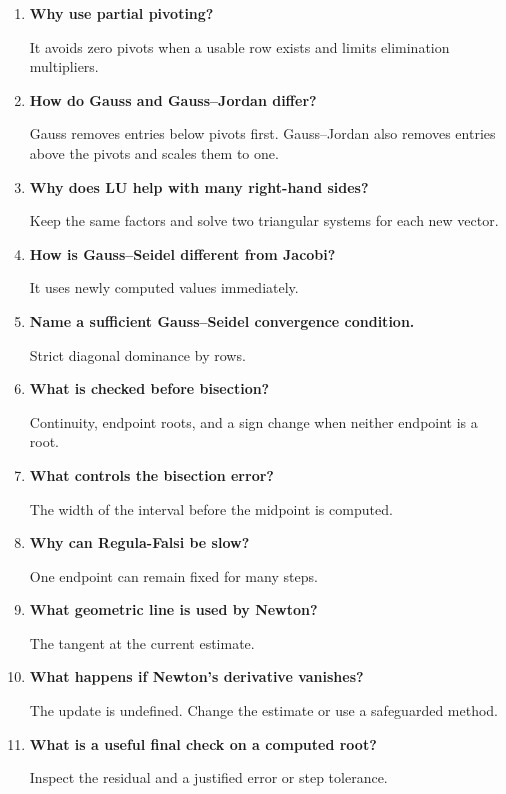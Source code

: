 \documentclass[12pt,a4paper]{article}
\newcommand{\Q}[1]{\textbf{#1}\par\noindent\ignorespaces}
\begin{document}
\begin{tcolorbox}[exambox, title={Frequently Asked / Viva Questions}]
\begin{enumerate}[topsep=0pt, label=\textbf{Q\arabic*.}, itemsep=5pt, leftmargin=*]
  \item \Q{Why use partial pivoting?}
    It avoids zero pivots when a usable row exists and limits elimination multipliers.
  \item \Q{How do Gauss and Gauss--Jordan differ?}
    Gauss removes entries below pivots first. Gauss--Jordan also removes entries above the pivots and scales them to one.
  \item \Q{Why does LU help with many right-hand sides?}
    Keep the same factors and solve two triangular systems for each new vector.
  \item \Q{How is Gauss--Seidel different from Jacobi?}
    It uses newly computed values immediately.
  \item \Q{Name a sufficient Gauss--Seidel convergence condition.}
    Strict diagonal dominance by rows.
  \item \Q{What is checked before bisection?}
    Continuity, endpoint roots, and a sign change when neither endpoint is a root.
  \item \Q{What controls the bisection error?}
    The width of the interval before the midpoint is computed.
  \item \Q{Why can Regula-Falsi be slow?}
    One endpoint can remain fixed for many steps.
  \item \Q{What geometric line is used by Newton?}
    The tangent at the current estimate.
  \item \Q{What happens if Newton's derivative vanishes?}
    The update is undefined. Change the estimate or use a safeguarded method.
  \item \Q{What is a useful final check on a computed root?}
    Inspect the residual and a justified error or step tolerance.
\end{enumerate}
\end{tcolorbox}
\end{document}

